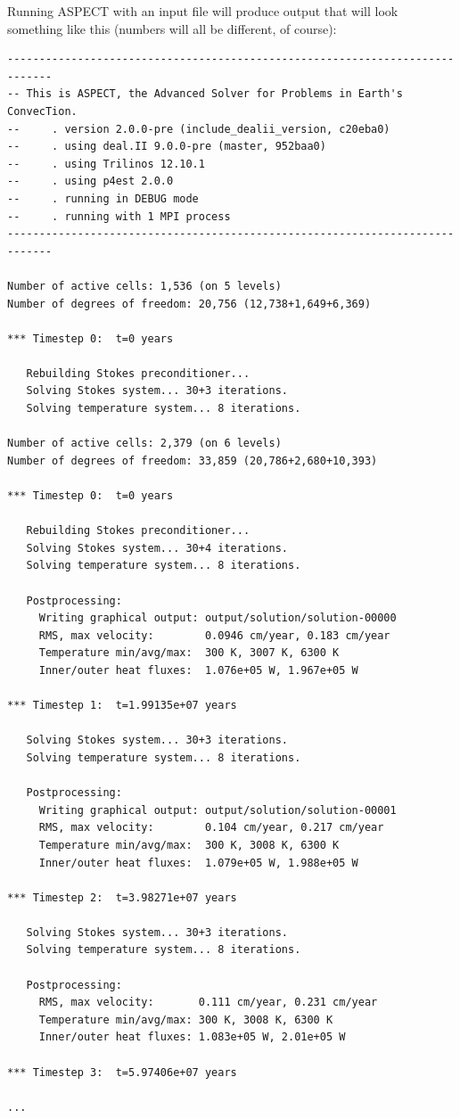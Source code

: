 \documentclass{article}
\newcommand{\aspect}{\textsc{ASPECT}}
\begin{document}
Running \aspect{} with an input file will produce output that will look
something like this (numbers will all be different, of course):
\begin{lstlisting}[frame=single,language=ksh]
-----------------------------------------------------------------------------
-- This is ASPECT, the Advanced Solver for Problems in Earth's ConvecTion.
--     . version 2.0.0-pre (include_dealii_version, c20eba0)
--     . using deal.II 9.0.0-pre (master, 952baa0)
--     . using Trilinos 12.10.1
--     . using p4est 2.0.0
--     . running in DEBUG mode
--     . running with 1 MPI process
-----------------------------------------------------------------------------

Number of active cells: 1,536 (on 5 levels)
Number of degrees of freedom: 20,756 (12,738+1,649+6,369)

*** Timestep 0:  t=0 years

   Rebuilding Stokes preconditioner...
   Solving Stokes system... 30+3 iterations.
   Solving temperature system... 8 iterations.

Number of active cells: 2,379 (on 6 levels)
Number of degrees of freedom: 33,859 (20,786+2,680+10,393)

*** Timestep 0:  t=0 years

   Rebuilding Stokes preconditioner...
   Solving Stokes system... 30+4 iterations.
   Solving temperature system... 8 iterations.

   Postprocessing:
     Writing graphical output: output/solution/solution-00000
     RMS, max velocity:        0.0946 cm/year, 0.183 cm/year
     Temperature min/avg/max:  300 K, 3007 K, 6300 K
     Inner/outer heat fluxes:  1.076e+05 W, 1.967e+05 W

*** Timestep 1:  t=1.99135e+07 years

   Solving Stokes system... 30+3 iterations.
   Solving temperature system... 8 iterations.

   Postprocessing:
     Writing graphical output: output/solution/solution-00001
     RMS, max velocity:        0.104 cm/year, 0.217 cm/year
     Temperature min/avg/max:  300 K, 3008 K, 6300 K
     Inner/outer heat fluxes:  1.079e+05 W, 1.988e+05 W

*** Timestep 2:  t=3.98271e+07 years

   Solving Stokes system... 30+3 iterations.
   Solving temperature system... 8 iterations.

   Postprocessing:
     RMS, max velocity:       0.111 cm/year, 0.231 cm/year
     Temperature min/avg/max: 300 K, 3008 K, 6300 K
     Inner/outer heat fluxes: 1.083e+05 W, 2.01e+05 W

*** Timestep 3:  t=5.97406e+07 years

...
\end{lstlisting}
\end{document}

